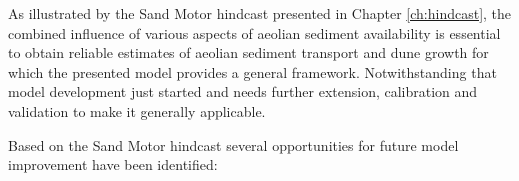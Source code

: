 
As illustrated by the Sand Motor hindcast presented in Chapter
\ref{ch:hindcast}, the combined influence of various aspects of
aeolian sediment availability is essential to obtain reliable
estimates of aeolian sediment transport and dune growth for which the
presented model provides a general framework. Notwithstanding that
model development just started and needs further extension,
calibration and validation to make it generally applicable.

Based on the Sand Motor hindcast several opportunities for future
model improvement have been identified:

